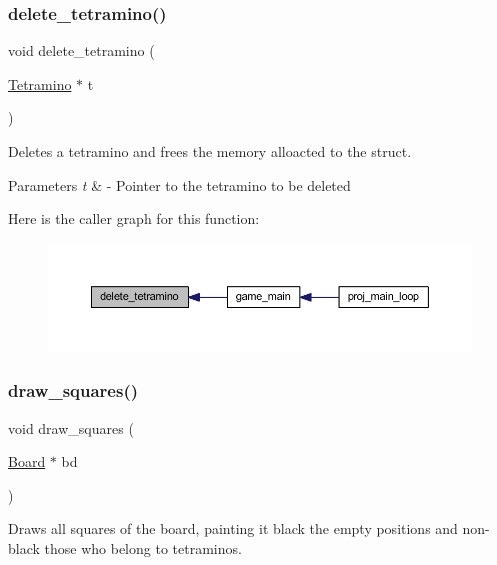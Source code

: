 \subsubsection{\texorpdfstring{delete\+\_\+tetramino()}{delete\_tetramino()}}
{\footnotesize\ttfamily void delete\+\_\+tetramino (\begin{DoxyParamCaption}\item[{\mbox{\hyperlink{struct_tetramino}{Tetramino}} $\ast$}]{t }\end{DoxyParamCaption})}



Deletes a tetramino and frees the memory alloacted to the struct. 


\begin{DoxyParams}{Parameters}
{\em t} & -\/ Pointer to the tetramino to be deleted \\
\hline
\end{DoxyParams}
Here is the caller graph for this function\+:
\nopagebreak
\begin{figure}[H]
\begin{center}
\leavevmode
\includegraphics[width=350pt]{group__tetramino_ga562ee8dcd3b145bafdf0311f1a3b7296_icgraph}
\end{center}
\end{figure}
\mbox{\label{group__tetramino_ga64e78e0b93dcd6d9b3092b4b8d1fd339}} 
\subsubsection{\texorpdfstring{draw\+\_\+squares()}{draw\_squares()}}
{\footnotesize\ttfamily void draw\+\_\+squares (\begin{DoxyParamCaption}\item[{\mbox{\hyperlink{struct_board}{Board}} $\ast$}]{bd }\end{DoxyParamCaption})}



Draws all squares of the board, painting it black the empty positions and non-\/black those who belong to tetraminos. 


